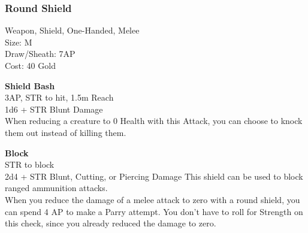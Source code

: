 \subsubsection{Round Shield}\label{weapon:roundShield}
Weapon, Shield, One-Handed, Melee\\
Size: M\\
Draw/Sheath: 7AP\\
Cost: 40 Gold

\textbf{Shield Bash}\\
3AP, STR to hit, 1.5m Reach\\
1d6 + \texttimes STR Blunt Damage\\
When reducing a creature to 0 Health with this Attack, you can choose to knock them out instead of killing them.

\textbf{Block}\\
STR to block\\
2d4 + \texttimes STR Blunt, Cutting, or Piercing Damage
This shield can be used to block ranged ammunition attacks.\\
When you reduce the damage of a melee attack to zero with a round shield, you can spend 4 AP to make a Parry attempt.
You don't have to roll for Strength on this check, since you already reduced the damage to zero.\\
